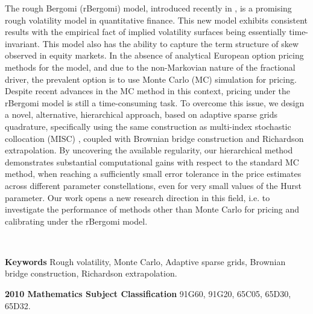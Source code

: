 
The rough Bergomi (rBergomi) model, introduced recently in  \cite{bayer2016pricing}, is a promising rough volatility model in quantitative finance. This new model exhibits consistent results with the empirical fact of implied volatility surfaces being essentially time-invariant. This model also has  the  ability to capture the term structure of skew observed in equity markets. In the absence of analytical European option pricing methods for the model, and due to the non-Markovian nature of the fractional driver, the prevalent option is to use Monte Carlo (MC) simulation for pricing. Despite recent advances in the MC method in this context, pricing under the rBergomi model is still a time-consuming task. To overcome this issue, we design a novel,  alternative, hierarchical approach, based on adaptive sparse grids quadrature, specifically using the same construction as   multi-index stochastic collocation (MISC) \cite{haji2016multi}, coupled with Brownian bridge construction and Richardson extrapolation. By uncovering the available regularity,  our hierarchical method demonstrates substantial computational gains with respect to the standard MC method, when reaching a sufficiently small error tolerance in the price estimates across different parameter constellations, even for very small values of the Hurst  parameter. Our work opens a new research direction in this field, i.e. to investigate the performance of  methods  other than Monte Carlo for pricing and calibrating under the rBergomi model.

\

\textbf{Keywords} Rough volatility, Monte Carlo, Adaptive sparse grids, Brownian bridge construction, Richardson extrapolation.

\textbf{2010 Mathematics Subject Classification} 	91G60, 	91G20, 65C05, 65D30, 65D32.